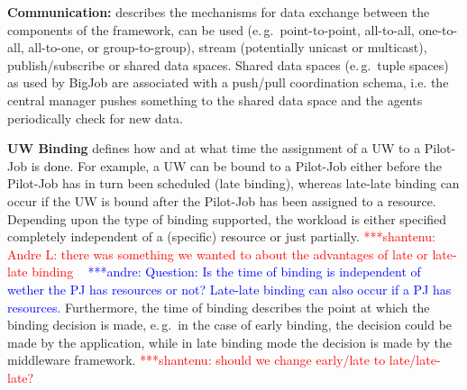 \documentclass[conference,final]{IEEEtran}
\newcommand{\jhanote}[1]{ {\textcolor{red} { ***shantenu: #1 }}}
\newcommand{\alnote}[1]{ {\textcolor{blue} { ***andre: #1 }}}
\newcommand{\alnote}[1]{}
\newcommand{\jhanote}[1]{}
\begin{document}
\textbf{Communication:} describes the mechanisms for data exchange
between the components of the framework, can be used (e.\,g.\
point-to-point, all-to-all, one-to-all, all-to-one, or
group-to-group), stream (potentially unicast or multicast),
publish/subscribe or shared data spaces. Shared data spaces (e.\,g.\
tuple spaces) as used by BigJob are associated with a push/pull
coordination schema, i.e. the central manager pushes something to the
shared data space and the agents periodically check for new data.
		

\textbf{UW Binding} defines how and at what time the assignment of a
UW to a Pilot-Job is done.  For example, a UW can be bound to a
Pilot-Job either before the Pilot-Job has in turn been scheduled (late
binding), whereas late-late binding can occur if the UW is bound after
the Pilot-Job has been assigned to a resource.  Depending upon the
type of binding supported, the workload is either specified completely
independent of a (specific) resource or just partially.
\jhanote{Andre L: there was something we wanted to about the
  advantages of late or late-late binding} \alnote{Question: Is the time of 
binding is independent of wether the PJ has resources or not? Late-late binding 
can also occur if a PJ has resources.}
Furthermore, the time of binding describes the point at which the
binding decision is made, e.\,g.\ in the case of early binding, the
decision could be made by the application, while in late binding mode
the decision is made by the middleware framework. \jhanote{should we
  change early/late to late/late-late?}

\end{document}
